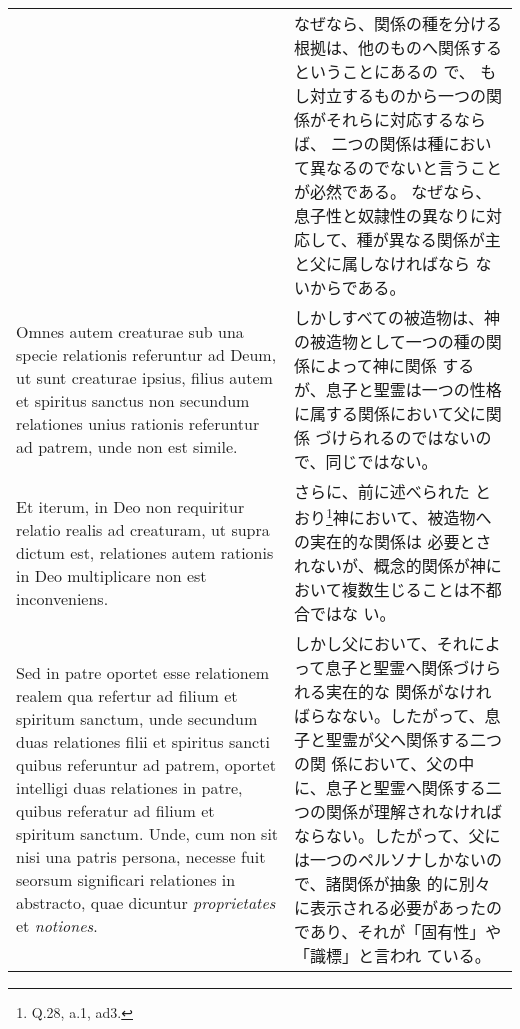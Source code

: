 \documentclass[10pt]{jsarticle} %
\begin{document}
\begin{longtable}{p{21em}p{21em}}
&

なぜなら、関係の種を分ける根拠は、他のものへ関係するということにあるの
で、
もし対立するものから一つの関係がそれらに対応するならば、
二つの関係は種において異なるのでないと言うことが必然である。
なぜなら、
息子性と奴隷性の異なりに対応して、種が異なる関係が主と父に属しなければなら
ないからである。


\\


Omnes autem
creaturae sub una specie relationis referuntur ad Deum, ut sunt
creaturae ipsius, filius autem et spiritus sanctus non secundum
relationes unius rationis referuntur ad patrem, unde non est
simile. 

&

しかしすべての被造物は、神の被造物として一つの種の関係によって神に関係
 するが、息子と聖霊は一つの性格に属する関係において父に関係
 づけられるのではないので、同じではない。

\\

Et iterum, in Deo non requiritur relatio realis ad creaturam,
ut supra dictum est, relationes autem rationis in Deo multiplicare non
est inconveniens. 

&

さらに、前に述べられた
 とおり\footnote{Q.28, a.1, ad3.}神において、被造物への実在的な関係は
 必要とされないが、概念的関係が神において複数生じることは不都合ではな
 い。

\\

Sed in patre oportet esse relationem realem qua
refertur ad filium et spiritum sanctum, unde secundum duas relationes
filii et spiritus sancti quibus referuntur ad patrem, oportet
intelligi duas relationes in patre, quibus referatur ad filium et
spiritum sanctum. Unde, cum non sit nisi una patris persona, necesse
fuit seorsum significari relationes in abstracto, quae dicuntur
{\itshape proprietates} et {\itshape notiones}.


&

しかし父において、それによって息子と聖霊へ関係づけられる実在的な
 関係がなければらなない。したがって、息子と聖霊が父へ関係する二つの関
 係において、父の中に、息子と聖霊へ関係する二つの関係が理解されなければ
 ならない。したがって、父には一つのペルソナしかないので、諸関係が抽象
 的に別々に表示される必要があったのであり、それが「固有性」や「識標」と言われ
 ている。



\\




\end{longtable}
\end{document}
